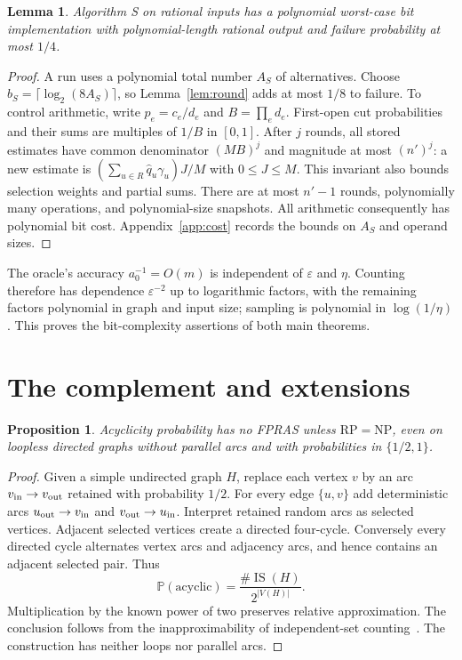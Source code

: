 \documentclass[11pt]{article}
\newtheorem{lemma}[theorem]{Lemma}
\newtheorem{proposition}[theorem]{Proposition}
\newcommand{\Prb}{\mathbb{P}}
\begin{document}
\begin{lemma}\label{lem:discrete}
Algorithm S on rational inputs has a polynomial worst-case bit implementation
with polynomial-length rational output and failure probability at most $1/4$.
\end{lemma}
\begin{proof}
A run uses a polynomial total number $A_S$ of alternatives. Choose
$b_S=\lceil\log_2(8A_S)\rceil$, so Lemma~\ref{lem:round} adds at most $1/8$
to failure. To control arithmetic, write $p_e=c_e/d_e$ and $B=\prod_e d_e$.
First-open cut probabilities and their sums are multiples of $1/B$ in $[0,1]$.
After $j$ rounds, all stored estimates have common denominator $(MB)^j$
and magnitude at most $(n')^j$: a new estimate is
$(\sum_{u\in R}\widehat q_u\gamma_u)J/M$ with $0\leq J\leq M$.
This invariant also bounds selection weights and partial sums. There are
at most $n'-1$ rounds, polynomially many operations, and polynomial-size
snapshots. All arithmetic consequently has polynomial bit cost.
Appendix~\ref{app:cost} records the bounds on $A_S$ and operand sizes.
\end{proof}

The oracle's accuracy $a_0^{-1}=O(m)$ is independent of $\varepsilon$ and
$\eta$. Counting therefore has dependence $\varepsilon^{-2}$ up to
logarithmic factors, with the remaining factors polynomial in graph and
input size; sampling is polynomial in $\log(1/\eta)$. This proves the
bit-complexity assertions of both main theorems.

\section{The complement and extensions}
\begin{proposition}\label{prop:hard}
Acyclicity probability has no FPRAS unless $\mathrm{RP}=\mathrm{NP}$, even
on loopless directed graphs without parallel arcs and with probabilities
in $\{1/2,1\}$.
\end{proposition}
\begin{proof}
Given a simple undirected graph $H$, replace each vertex $v$ by an arc
$v_{\rm in}\to v_{\rm out}$ retained with probability $1/2$. For every
edge $\{u,v\}$ add deterministic arcs $u_{\rm out}\to v_{\rm in}$ and
$v_{\rm out}\to u_{\rm in}$. Interpret retained random arcs as selected
vertices. Adjacent selected vertices create a directed four-cycle.
Conversely every directed cycle alternates vertex arcs and adjacency arcs,
and hence contains an adjacent selected pair. Thus
\[
 \Prb(\text{acyclic})=\frac{\#\operatorname{IS}(H)}{2^{|V(H)|}}.
\]
Multiplication by the known power of two preserves relative approximation.
The conclusion follows from the inapproximability of independent-set
counting~\cite{dfj}. The construction has neither loops nor parallel arcs.
\end{proof}
\end{document}
